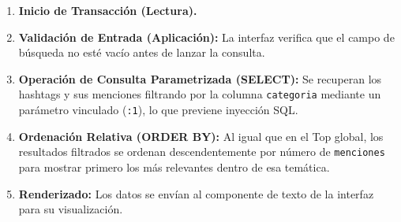 \begin{enumerate} \item \textbf{Inicio de Transacción (Lectura).} \item \textbf{Validación de Entrada (Aplicación):} La interfaz verifica que el campo de búsqueda no esté vacío antes de lanzar la consulta. \item \textbf{Operación de Consulta Parametrizada (SELECT):} Se recuperan los hashtags y sus menciones filtrando por la columna \texttt{categoria} mediante un parámetro vinculado (\texttt{:1}), lo que previene inyección SQL. \item \textbf{Ordenación Relativa (ORDER BY):} Al igual que en el Top global, los resultados filtrados se ordenan descendentemente por número de \texttt{menciones} para mostrar primero los más relevantes dentro de esa temática. \item \textbf{Renderizado:} Los datos se envían al componente de texto de la interfaz para su visualización. \end{enumerate}